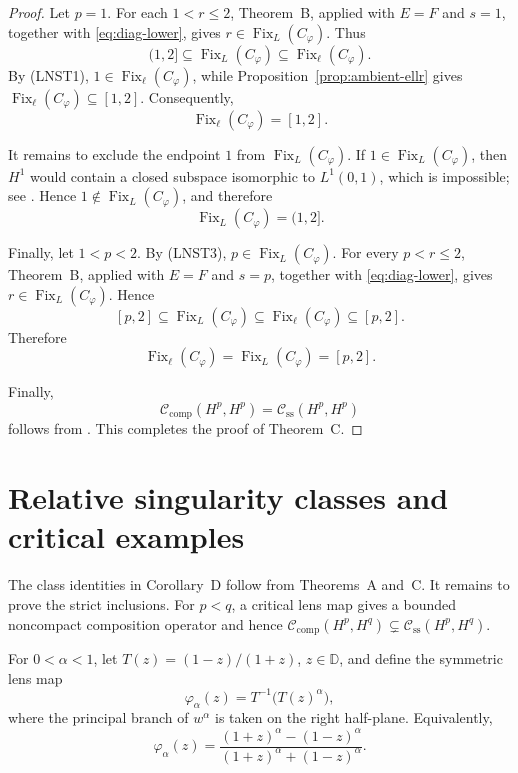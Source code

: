 \documentclass[11pt, reqno]{amsart}
\theoremstyle{definition}
\theoremstyle{remark}
\newcommand{\D}{\mathbb{D}}
\newcommand{\CK}{\mathcal C_{\mathrm{comp}}}
\newcommand{\CS}{\mathcal C_{\mathrm{ss}}}
\begin{document}
\begin{proof}
Let \(p=1\). For each \(1<r\le2\), Theorem~B, applied with
\(E=F\) and \(s=1\), together with
\eqref{eq:diag-lower}, gives
\(r\in\operatorname{Fix}_{L}(C_\varphi)\). Thus
\[
        (1,2]
        \subseteq
        \operatorname{Fix}_{L}(C_\varphi)
        \subseteq
        \operatorname{Fix}_{\ell}(C_\varphi).
\]
By \textup{(LNST1)},
\(1\in\operatorname{Fix}_{\ell}(C_\varphi)\), while
Proposition~\ref{prop:ambient-ellr} gives
\(\operatorname{Fix}_{\ell}(C_\varphi)\subseteq[1,2]\).
Consequently,
\[
        \operatorname{Fix}_{\ell}(C_\varphi)=[1,2].
\]

It remains to exclude the endpoint \(1\) from
\(\operatorname{Fix}_{L}(C_\varphi)\).
If \(1\in\operatorname{Fix}_{L}(C_\varphi)\), then \(H^1\) would
contain a closed subspace isomorphic to \(L^1(0,1)\), which is
impossible; see \cite[p.~262]{KwapienPelczynski1976}. Hence
\(1\notin\operatorname{Fix}_{L}(C_\varphi)\), and therefore
\[
        \operatorname{Fix}_{L}(C_\varphi)=(1,2].
\]

Finally, let \(1<p<2\). By \textup{(LNST3)},
\(p\in\operatorname{Fix}_{L}(C_\varphi)\). For every \(p<r\le2\),
Theorem~B, applied with \(E=F\) and \(s=p\), together with
\eqref{eq:diag-lower}, gives
\(r\in\operatorname{Fix}_{L}(C_\varphi)\). Hence
\[
        [p,2]
        \subseteq
        \operatorname{Fix}_{L}(C_\varphi)
        \subseteq
        \operatorname{Fix}_{\ell}(C_\varphi)
        \subseteq
        [p,2].
\]
Therefore
\[
        \operatorname{Fix}_{\ell}(C_\varphi)
        =
        \operatorname{Fix}_{L}(C_\varphi)
        =
        [p,2].
\]

Finally,
\[
        \CK(H^p,H^p)
        =
        \CS(H^p,H^p)
\]
follows from \cite[Corollary~1.3]{LNST2017}.
This completes the proof of Theorem~C.
\end{proof}

\section{Relative singularity classes and critical examples}
\label{sec:lens}

The class identities in Corollary~D follow from Theorems~A and~C.
It remains to prove the strict inclusions. For \(p<q\), a critical
lens map gives a bounded noncompact composition operator and hence
\(\CK(H^p,H^q)\subsetneq\CS(H^p,H^q)\).

For \(0<\alpha<1\), let
\(T(z)=(1-z)/(1+z)\), \(z\in\D\), and define the symmetric lens map
\begin{equation}
\label{eq:lens-map}
        \varphi_\alpha(z)
        =
        T^{-1}\bigl(T(z)^\alpha\bigr),
\end{equation}
where the principal branch of \(w^\alpha\) is taken on the right
half-plane. Equivalently,
\[
        \varphi_\alpha(z)
        =
        \frac{(1+z)^\alpha-(1-z)^\alpha}
        {(1+z)^\alpha+(1-z)^\alpha}.
\]
\end{document}
